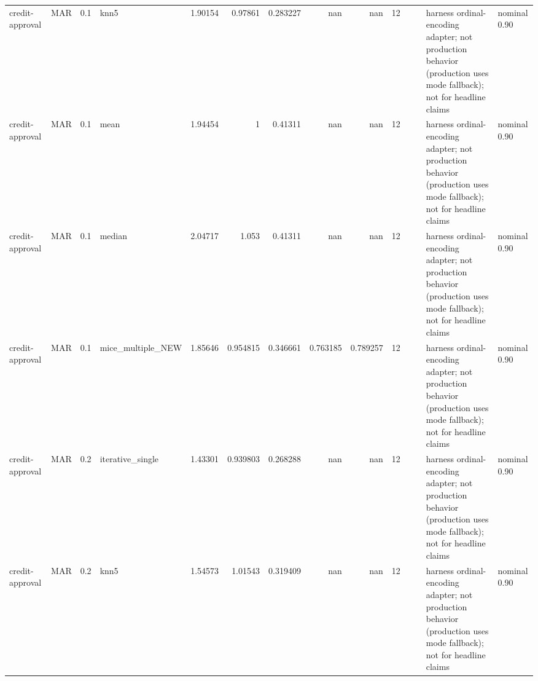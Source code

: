 \begin{table}[ht]
\begin{tabular}{llrlrrrrrrllll}
 credit-approval      & MAR         &         0.1 & knn5              &       1.90154  &             0.97861  &                 0.283227 &                     nan        &                       nan        &        12 &                    &                                         & harness ordinal-encoding adapter; not production behavior (production uses mode fallback); not for headline claims & nominal 0.90              \\
 credit-approval      & MAR         &         0.1 & mean              &       1.94454  &             1        &                 0.41311  &                     nan        &                       nan        &        12 &                    &                                         & harness ordinal-encoding adapter; not production behavior (production uses mode fallback); not for headline claims & nominal 0.90              \\
 credit-approval      & MAR         &         0.1 & median            &       2.04717  &             1.053    &                 0.41311  &                     nan        &                       nan        &        12 &                    &                                         & harness ordinal-encoding adapter; not production behavior (production uses mode fallback); not for headline claims & nominal 0.90              \\
 credit-approval      & MAR         &         0.1 & mice\_multiple\_NEW &       1.85646  &             0.954815 &                 0.346661 &                       0.763185 &                         0.789257 &        12 &                    &                                         & harness ordinal-encoding adapter; not production behavior (production uses mode fallback); not for headline claims & nominal 0.90              \\
 credit-approval      & MAR         &         0.2 & iterative\_single  &       1.43301  &             0.939803 &                 0.268288 &                     nan        &                       nan        &        12 &                    &                                         & harness ordinal-encoding adapter; not production behavior (production uses mode fallback); not for headline claims & nominal 0.90              \\
 credit-approval      & MAR         &         0.2 & knn5              &       1.54573  &             1.01543  &                 0.319409 &                     nan        &                       nan        &        12 &                    &                                         & harness ordinal-encoding adapter; not production behavior (production uses mode fallback); not for headline claims & nominal 0.90              \\

\end{tabular}
\end{table}
